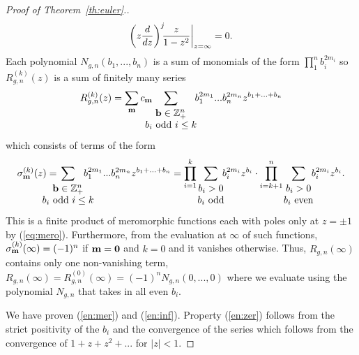 \documentclass{amsart}
\newcommand{\bz}{\mathbb{Z}}
\begin{document}
\begin{proof}[Proof of Theorem~\ref{th:euler}.]
\[\left(z\frac{d}{dz}\right)^j\hspace{-2mm}\left.\frac{z}{1-z^2}\right|_{z=\infty}=0.\]
Each polynomial $N_{g,n}(b_1,...,b_n)$ is a sum of monomials of the form $\prod_1^nb_i^{2m_i}$ so $R^{(k)}_{g,n}(z)$ is a sum of finitely many series
\[R^{(k)}_{g,n}(z)=\sum_{\bf m}c_{\bf m}\hspace{-5mm}\sum_{\begin{array}{c}{\bf b}\in\bz_+^n\\b_i{\rm\ odd\ }i\leq k\end{array}}\hspace{-3mm}b_1^{2m_1}...b_n^{2m_n}z^{b_1+...+b_n}\]
which consists of terms of the form
\[\sigma^{(k)}_{\bf m}(z)=\hspace{-8mm}\sum_{\begin{array}{c}{\bf b}\in\bz_+^n\\b_i{\rm\ odd\ }i\leq k\end{array}}\hspace{-6mm}b_1^{2m_1}...b_n^{2m_n}z^{b_1+...+b_n}=\prod_{i=1}^k\hspace{-2mm}\sum_{\begin{array}{c}b_i>0\\b_i{\rm\ odd}\end{array}}\hspace{-3mm}b_i^{2m_i}z^{b_i}\cdot\prod_{i=k+1}^n\hspace{-2mm}\sum_{\begin{array}{c}b_i>0\\b_i{\rm\ even}\end{array}}\hspace{-3mm}b_i^{2m_i}z^{b_i}.\]
This is a finite product of meromorphic functions each with poles only at $z=\pm 1$ by (\ref{eq:mero}).  Furthermore, from the evaluation at $\infty$ of such functions, $\sigma^{(k)}_{\bf m}(\infty)=(-1)^n$ if ${\bf m}={\bf 0}$ and $k=0$ and it vanishes otherwise.  Thus, $R_{g,n}(\infty)$ contains only one non-vanishing term, $R_{g,n}(\infty)=R^{(0)}_{g,n}(\infty)=(-1)^nN_{g,n}(0,...,0)$ where we evaluate using the polynomial $N_{g,n}$ that takes in all even $b_i$.

We have proven (\ref{en:mer}) and (\ref{en:inf}).  Property (\ref{en:zer}) follows from the strict positivity of the $b_i$ and the convergence of the series which follows from the convergence of $1+z+z^2+...$ for $|z|<1$.


\end{proof}
\end{document}
